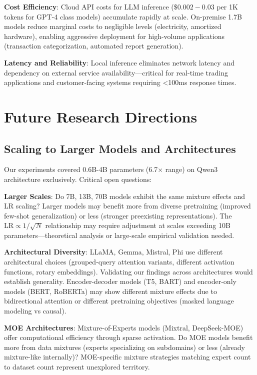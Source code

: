 \textbf{Cost Efficiency}: Cloud API costs for LLM inference ($\$0.002-0.03$ per 1K tokens for GPT-4 class models) accumulate rapidly at scale. On-premise 1.7B models reduce marginal costs to negligible levels (electricity, amortized hardware), enabling aggressive deployment for high-volume applications (transaction categorization, automated report generation).

\textbf{Latency and Reliability}: Local inference eliminates network latency and dependency on external service availability—critical for real-time trading applications and customer-facing systems requiring <100ms response times.

\section{Future Research Directions}

\subsection{Scaling to Larger Models and Architectures}

Our experiments covered 0.6B-4B parameters (6.7$\times$ range) on Qwen3 architecture exclusively. Critical open questions:

\textbf{Larger Scales}: Do 7B, 13B, 70B models exhibit the same mixture effects and LR scaling? Larger models may benefit more from diverse pretraining (improved few-shot generalization) or less (stronger preexisting representations). The $\text{LR} \propto 1/\sqrt{N}$ relationship may require adjustment at scales exceeding 10B parameters—theoretical analysis or large-scale empirical validation needed.

\textbf{Architectural Diversity}: LLaMA, Gemma, Mistral, Phi use different architectural choices (grouped-query attention variants, different activation functions, rotary embeddings). Validating our findings across architectures would establish generality. Encoder-decoder models (T5, BART) and encoder-only models (BERT, RoBERTa) may show different mixture effects due to bidirectional attention or different pretraining objectives (masked language modeling vs causal).

\textbf{MOE Architectures}: Mixture-of-Experts models (Mixtral, DeepSeek-MOE) offer computational efficiency through sparse activation. Do MOE models benefit more from data mixtures (experts specializing on subdomains) or less (already mixture-like internally)? MOE-specific mixture strategies matching expert count to dataset count represent unexplored territory.

